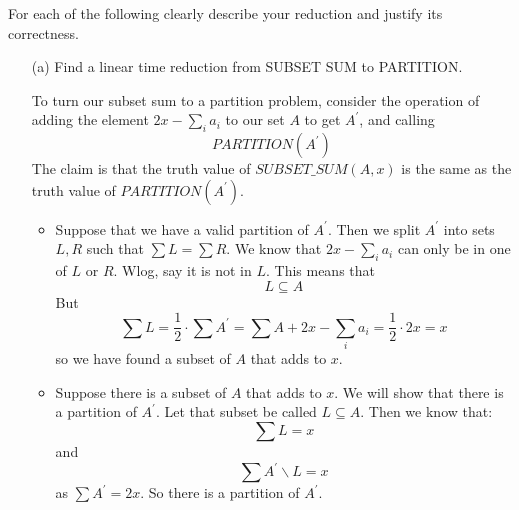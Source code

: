 \documentclass{article}
\begin{document}
For each of the following clearly describe your reduction and justify its correctness.
    \begin{itemize}
        \item [(a)] Find a linear time reduction from SUBSET SUM to PARTITION.
            \begin{answer}
                To turn our subset sum to a partition problem, consider the operation of adding the element $2x - \sum_{i} a_{i}$ to our set $A$ to get $A^{\prime}$, and calling 
                    \begin{equation*}
                        PARTITION(A^{\prime})
                    \end{equation*}
                The claim is that the truth value of $SUBSET\_SUM(A, x)$ is the same as the truth value of $PARTITION(A^{\prime})$.
                    \begin{itemize}
                        \item Suppose that we have a valid partition of $A^{\prime}$. Then we split $A^{\prime}$ into sets $L, R$ such that $\sum L = \sum R$. We know that $2x - \sum_{i} a_{i}$ can only be in one of $L$ or $R$. Wlog, say it is not in $L$. This means that
                            \begin{equation*}
                                L \subseteq A
                            \end{equation*}
                        But 
                            \begin{equation*}
                                \sum L = \frac{1}{2} \cdot \sum A^{\prime} = \sum A + 2x - \sum_{i} a_{i} = \dfrac{1}{2} \cdot 2x = x
                            \end{equation*}
                        so we have found a subset of $A$ that adds to $x$.

                        \item Suppose there is a subset of $A$ that adds to $x$. We will show that there is a partition of $A^{\prime}$. Let that subset be called $L  \subseteq A $. Then we know that:
                            \begin{equation*}
                                \sum L = x
                            \end{equation*}
                        and 
                            \begin{equation*}
                                \sum A^{\prime} \backslash L = x
                            \end{equation*}
                        as $\sum A^{\prime} = 2x$. So there is a partition of $A^{\prime}$.
                    \end{itemize}
            \end{answer}


\end{itemize}
\end{document}
